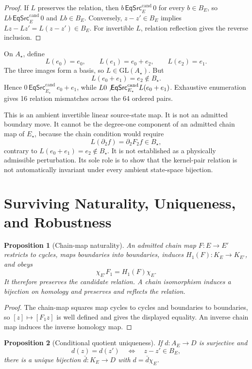 \documentclass[11pt]{article}
\newtheorem{proposition}{Proposition}
\newcommand{\EqCand}{\mathsf{EqSrc}^{\mathrm{cand}}}
\begin{document}
\begin{proof}
If \(L\) preserves the relation, then \(b\,\EqCand_E\,0\) for every
\(b\in B_E\), so \(Lb\,\EqCand_E\,0\) and \(Lb\in B_E\). Conversely,
\(z-z'\in B_E\) implies
\(Lz-Lz'=L(z-z')\in B_E\). For invertible \(L\), relation reflection gives
the reverse inclusion.
\end{proof}

On \(A_\star\), define
\[
L(e_0)=e_0,\qquad
L(e_1)=e_0+e_2,\qquad
L(e_2)=e_1.
\]
The three images form a basis, so \(L\in\mathrm{GL}(A_\star)\). But
\[
L(e_0+e_1)=e_2\notin B_\star.
\]
Hence \(0\,\EqCand_{E_\star}\,e_0+e_1\), while
\(L0\not\EqCand_{E_\star}L(e_0+e_1)\). Exhaustive enumeration gives 16
relation mismatches across the 64 ordered pairs.

This is an ambient invertible linear source-state map. It is not an admitted
boundary move. It cannot be the degree-one component of an admitted chain map
of \(E_\star\), because the chain condition would require
\[
L(\partial_2f)=\partial_2F_2f\in B_\star,
\]
contrary to \(L(e_0+e_1)=e_2\notin B_\star\). It is not established as a
physically admissible perturbation. Its sole role is to show that the
kernel-pair relation is not automatically invariant under every ambient
state-space bijection.

\section{Surviving Naturality, Uniqueness, and Robustness}

\begin{proposition}[Chain-map naturality]
An admitted chain map \(F:E\to E'\) restricts to cycles, maps boundaries into
boundaries, induces \(H_1(F):K_E\to K_{E'}\), and obeys
\[
\chi_{E'}F_1=H_1(F)\chi_E.
\]
It therefore preserves the candidate relation. A chain isomorphism induces a
bijection on homology and preserves and reflects the relation.
\end{proposition}

\begin{proof}
The chain-map squares map cycles to cycles and boundaries to boundaries, so
\([z]\mapsto[F_1z]\) is well defined and gives the displayed equality. An
inverse chain map induces the inverse homology map.
\end{proof}

\begin{proposition}[Conditional quotient uniqueness]
If \(d:A_E\to D\) is surjective and
\[
d(z)=d(z')\quad\Longleftrightarrow\quad z-z'\in B_E,
\]
there is a unique bijection \(\bar d:K_E\to D\) with
\(d=\bar d\chi_E\).
\end{proposition}
\end{document}
